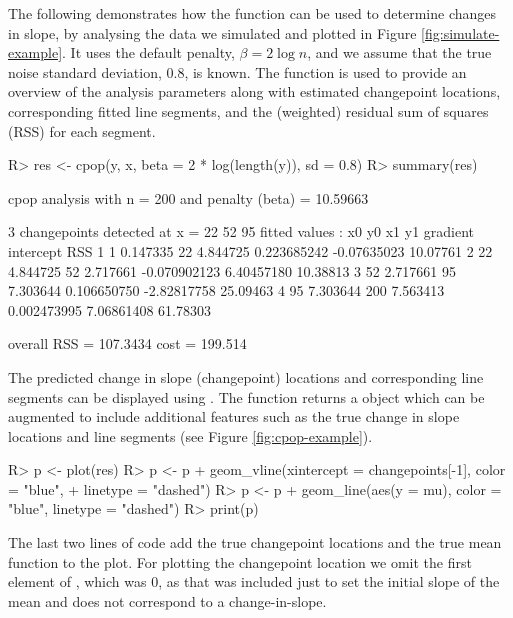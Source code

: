 \documentclass[article]{jss}
\begin{document}
%
%
The following demonstrates how the  function can be used to determine changes in slope, by analysing the data we simulated and plotted in Figure \ref{fig:simulate-example}. It uses the default penalty, $\beta=2\log n$, and we assume that the true noise standard deviation, 0.8, is known. The  function is used to provide an overview of the analysis parameters along with estimated changepoint locations, corresponding fitted line segments, and the (weighted) residual sum of squares (RSS) for each segment. 
%
%
\begin{CodeChunk}
\begin{CodeInput}
R> res <- cpop(y, x, beta = 2 * log(length(y)), sd = 0.8)
R> summary(res)
\end{CodeInput}
\begin{CodeOutput}
cpop analysis with n = 200 and penalty (beta)  = 10.59663

3  changepoints detected at x = 
 22 52 95
fitted values : 
  x0       y0  x1       y1     gradient   intercept      RSS
1  1 0.147335  22 4.844725  0.223685242 -0.07635023 10.07761
2 22 4.844725  52 2.717661 -0.070902123  6.40457180 10.38813
3 52 2.717661  95 7.303644  0.106650750 -2.82817758 25.09463
4 95 7.303644 200 7.563413  0.002473995  7.06861408 61.78303

overall RSS = 107.3434
cost = 199.514
\end{CodeOutput}
\end{CodeChunk}
%
%
The predicted change in slope (changepoint) locations and corresponding line segments can be displayed using . The  function returns a  object which can be augmented to include additional features such as the true change in slope locations and line segments (see Figure \ref{fig:cpop-example}).
%
%
\begin{CodeChunk}
\begin{CodeInput}
R> p <- plot(res)
R> p <- p + geom_vline(xintercept = changepoints[-1], color = "blue",
+                   linetype = "dashed")
R> p <- p + geom_line(aes(y = mu), color = "blue", linetype = "dashed")
R> print(p)
\end{CodeInput}
\end{CodeChunk}
The last two lines of code add the true changepoint locations and the true mean function to the plot. For plotting the changepoint location we omit the first element of , which was 0, as that was included just to set the initial slope of the mean and does not correspond to a change-in-slope.
\end{document}

